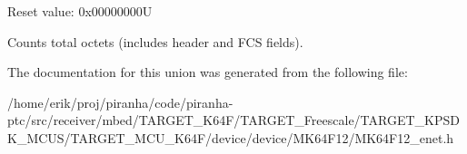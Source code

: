 Reset value\+: 0x00000000U

Counts total octets (includes header and F\+CS fields). 

The documentation for this union was generated from the following file\+:\begin{DoxyCompactItemize}
\item 
/home/erik/proj/piranha/code/piranha-\/ptc/src/receiver/mbed/\+T\+A\+R\+G\+E\+T\+\_\+\+K64\+F/\+T\+A\+R\+G\+E\+T\+\_\+\+Freescale/\+T\+A\+R\+G\+E\+T\+\_\+\+K\+P\+S\+D\+K\+\_\+\+M\+C\+U\+S/\+T\+A\+R\+G\+E\+T\+\_\+\+M\+C\+U\+\_\+\+K64\+F/device/device/\+M\+K64\+F12/M\+K64\+F12\+\_\+enet.\+h\end{DoxyCompactItemize}
